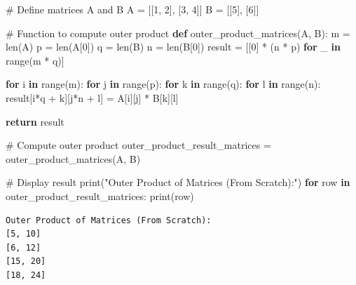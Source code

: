 \documentclass[
  letterpaper,
  DIV=11,
  numbers=noendperiod]{scrreprt}
\newenvironment{Shaded}{\begin{snugshade}}{\end{snugshade}}
\newcommand{\BuiltInTok}[1]{\textcolor[rgb]{0.00,0.23,0.31}{#1}}
\newcommand{\CommentTok}[1]{\textcolor[rgb]{0.37,0.37,0.37}{#1}}
\newcommand{\ControlFlowTok}[1]{\textcolor[rgb]{0.00,0.23,0.31}{\textbf{#1}}}
\newcommand{\DecValTok}[1]{\textcolor[rgb]{0.68,0.00,0.00}{#1}}
\newcommand{\KeywordTok}[1]{\textcolor[rgb]{0.00,0.23,0.31}{\textbf{#1}}}
\newcommand{\NormalTok}[1]{\textcolor[rgb]{0.00,0.23,0.31}{#1}}
\newcommand{\OperatorTok}[1]{\textcolor[rgb]{0.37,0.37,0.37}{#1}}
\newcommand{\StringTok}[1]{\textcolor[rgb]{0.13,0.47,0.30}{#1}}
\theoremstyle{plain}
\theoremstyle{definition}
\theoremstyle{remark}
\begin{document}
\begin{Shaded}
\begin{Highlighting}[]
\CommentTok{\# Define matrices A and B}
\NormalTok{A }\OperatorTok{=}\NormalTok{ [[}\DecValTok{1}\NormalTok{, }\DecValTok{2}\NormalTok{], [}\DecValTok{3}\NormalTok{, }\DecValTok{4}\NormalTok{]]}
\NormalTok{B }\OperatorTok{=}\NormalTok{ [[}\DecValTok{5}\NormalTok{], [}\DecValTok{6}\NormalTok{]]}

\CommentTok{\# Function to compute outer product}
\KeywordTok{def}\NormalTok{ outer\_product\_matrices(A, B):}
\NormalTok{    m }\OperatorTok{=} \BuiltInTok{len}\NormalTok{(A)}
\NormalTok{    p }\OperatorTok{=} \BuiltInTok{len}\NormalTok{(A[}\DecValTok{0}\NormalTok{])}
\NormalTok{    q }\OperatorTok{=} \BuiltInTok{len}\NormalTok{(B)}
\NormalTok{    n }\OperatorTok{=} \BuiltInTok{len}\NormalTok{(B[}\DecValTok{0}\NormalTok{])}
\NormalTok{    result }\OperatorTok{=}\NormalTok{ [[}\DecValTok{0}\NormalTok{] }\OperatorTok{*}\NormalTok{ (n }\OperatorTok{*}\NormalTok{ p) }\ControlFlowTok{for}\NormalTok{ \_ }\KeywordTok{in} \BuiltInTok{range}\NormalTok{(m }\OperatorTok{*}\NormalTok{ q)]}

    \ControlFlowTok{for}\NormalTok{ i }\KeywordTok{in} \BuiltInTok{range}\NormalTok{(m):}
        \ControlFlowTok{for}\NormalTok{ j }\KeywordTok{in} \BuiltInTok{range}\NormalTok{(p):}
            \ControlFlowTok{for}\NormalTok{ k }\KeywordTok{in} \BuiltInTok{range}\NormalTok{(q):}
                \ControlFlowTok{for}\NormalTok{ l }\KeywordTok{in} \BuiltInTok{range}\NormalTok{(n):}
\NormalTok{                    result[i}\OperatorTok{*}\NormalTok{q }\OperatorTok{+}\NormalTok{ k][j}\OperatorTok{*}\NormalTok{n }\OperatorTok{+}\NormalTok{ l] }\OperatorTok{=}\NormalTok{ A[i][j] }\OperatorTok{*}\NormalTok{ B[k][l]}

    \ControlFlowTok{return}\NormalTok{ result}

\CommentTok{\# Compute outer product}
\NormalTok{outer\_product\_result\_matrices }\OperatorTok{=}\NormalTok{ outer\_product\_matrices(A, B)}

\CommentTok{\# Display result}
\BuiltInTok{print}\NormalTok{(}\StringTok{"Outer Product of Matrices (From Scratch):"}\NormalTok{)}
\ControlFlowTok{for}\NormalTok{ row }\KeywordTok{in}\NormalTok{ outer\_product\_result\_matrices:}
    \BuiltInTok{print}\NormalTok{(row)}
\end{Highlighting}
\end{Shaded}

\begin{verbatim}
Outer Product of Matrices (From Scratch):
[5, 10]
[6, 12]
[15, 20]
[18, 24]
\end{verbatim}
\end{document}

